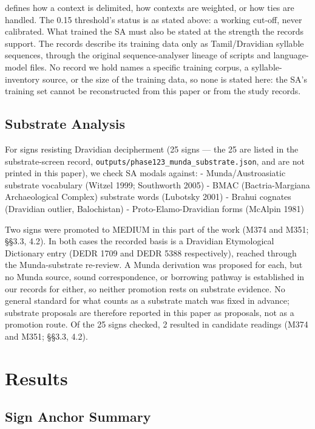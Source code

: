 \documentclass[11pt]{article}
\newcounter{none} %
\begin{document}
defines how a context is delimited, how contexts are weighted, or how ties are handled. The 0.15 threshold's status is as stated above: a working cut-off, never calibrated. What trained the SA must also be stated at the strength the records support. The records describe its training data only as Tamil/Dravidian syllable sequences, through the original sequence-analyser lineage of scripts and language-model files. No record we hold names a specific training corpus, a syllable-inventory source, or the size of the training data, so none is stated here: the SA's training set cannot be reconstructed from this paper or from the study records.

\subsection{Substrate Analysis}\label{substrate-analysis}

For signs resisting Dravidian decipherment (25 signs --- the 25 are listed in the substrate-screen record, \texttt{outputs/phase123\_munda\_substrate.json}, and are not printed in this paper), we check SA modals against: - Munda/Austroasiatic substrate vocabulary
(Witzel 1999; Southworth 2005) - BMAC (Bactria-Margiana Archaeological
Complex) substrate words (Lubotsky 2001) - Brahui cognates (Dravidian
outlier, Balochistan) - Proto-Elamo-Dravidian forms (McAlpin 1981)

Two signs were promoted to MEDIUM in this part of the work (M374 and M351; §§3.3, 4.2). In both cases the recorded basis is a Dravidian Etymological Dictionary entry (DEDR 1709 and DEDR 5388 respectively), reached through the Munda-substrate re-review. A Munda derivation was proposed for each, but no Munda source, sound correspondence, or borrowing pathway is established in our records for either, so neither promotion rests on substrate evidence. No general standard for what counts as a substrate match was fixed in advance; substrate proposals are therefore reported in this paper as proposals, not as a promotion route. Of the 25 signs checked, 2 resulted in candidate readings (M374 and M351; §§3.3, 4.2).

\section{Results}\label{results}

\subsection{Sign Anchor Summary}\label{sign-anchor-summary}
\end{document}
